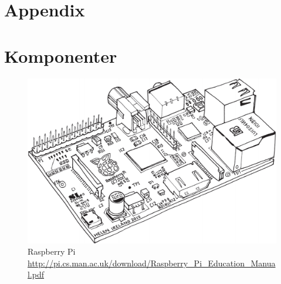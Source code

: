\documentclass{article}
\begin{document}
    \clearpage
    \printbibliography      
    \newpage
    \section*{Appendix} %
    \label{sec:appendix}
    \appendix
        \section{Komponenter} %
        \label{sec:komp}
                \begin{figure}[h!]
                  \centering
                    \includegraphics[scale=0.4]{img/rpi}
                  \caption[Raspberry Pi]{Raspberry Pi \\ \url{http://pi.cs.man.ac.uk/download/Raspberry_Pi_Education_Manual.pdf}}
                  \label{fig:raspberry}
                \end{figure}
\end{document}
